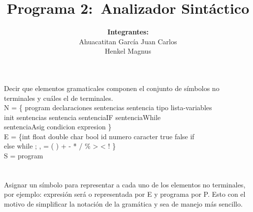 \documentclass[a4paper,10pt]{article}
\title{Programa 2:\
	   Analizador Sintáctico}
\author{\textbf{Integrantes:}\\
		Ahuacatitan García Juan Carlos \\
		Henkel Magnus}
\begin{document}
\maketitle


\section{}
Decir que elementos gramaticales componen el conjunto de símbolos no  terminales
y cuáles el de terminales.\\

\noindent
N = \{ program declaraciones sentencias sentencia tipo lista-variables\\
\-\hspace{1cm}init sentencias sentencia sentenciaIF sentenciaWhile\\
\-\hspace{1cm}sentenciaAsig condicion expresion \}\\

\noindent
E = \{int float double char bool id numero caracter true false if\\
\-\hspace{1cm}else while ; , = ( ) { } + - * / \% > < ! \}\\

\noindent
S = program

\section{}
Asignar un símbolo para representar a cada uno de los elementos no
terminales, por ejemplo: expresión será o representada por E y programa por P.
Esto con el motivo de simplificar la notación de la gramática y sea de manejo
más sencillo.
\\
\end{document}
